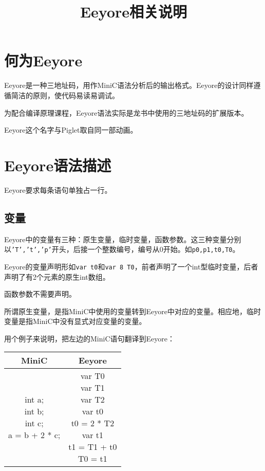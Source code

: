 \documentclass{ctexart}
\title{Eeyore相关说明}
\date{}
\author{}
\newenvironment{typewriterfont}{\ttfamily}{\par}
\begin{document}
\maketitle

\section{何为Eeyore}
Eeyore是一种三地址码，用作MiniC语法分析后的输出格式。Eeyore的设计同样遵循简洁的原则，使代码易读易调试。

为配合编译原理课程，Eeyore语法实际是龙书中使用的三地址码的扩展版本。

Eeyore这个名字与Piglet取自同一部动画。

\section{Eeyore语法描述}
Eeyore要求每条语句单独占一行。
\subsection{变量}
Eeyore中的变量有三种：原生变量，临时变量，函数参数。这三种变量分别以\texttt{'T','t','p'}开头，后接一个整数编号，编号从0开始。如\texttt{p0,p1,t0,T0}。

Eeyore的变量声明形如\texttt{var t0}和\texttt{var 8 T0}，前者声明了一个int型临时变量，后者声明了有2个元素的原生int数组。

函数参数不需要声明。

所谓原生变量，是指MiniC中使用的变量转到Eeyore中对应的变量。相应地，临时变量是指MiniC中没有显式对应变量的变量。

用个例子来说明，把左边的MiniC语句翻译到Eeyore：
\begin{table}[H]
    \centering
    \small
    \begin{typewriterfont}
    \begin{tabular}{|c|c|}
        \hline
        MiniC & Eeyore \\
        \hline
        \makecell[l]{int a;\\ int b;\\ int c;\\a = b + 2 * c;} & \makecell[l]{var T0\\var T1\\var T2\\var t0\\t0 = 2 * T2\\var t1\\t1 = T1 + t0\\T0 = t1} \\
        \hline
    \end{tabular}
    \end{typewriterfont}
\end{table}
\end{document}
